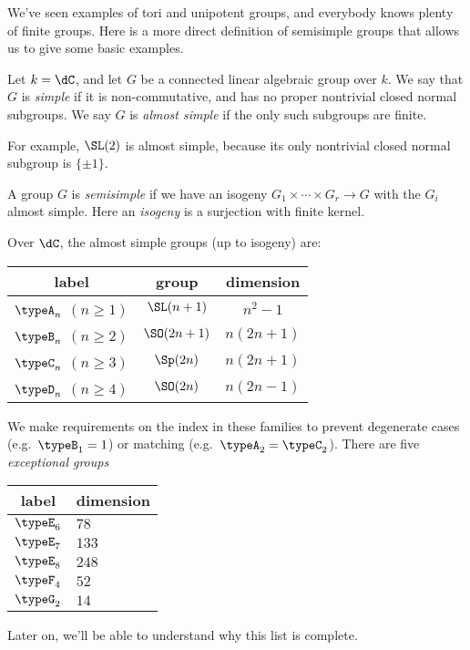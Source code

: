We've seen examples of tori and unipotent groups, and everybody knows plenty of 
finite groups. Here is a more direct definition of semisimple groups that 
allows us to give some basic examples. 

\begin{example}[Semisimple]
Let $k=\dC$, and let $G$ be a connected linear 
algebraic group over $k$. We say that $G$ is \emph{simple} if it is 
non-commutative, and has no proper nontrivial closed normal subgroups. We say 
$G$ is \emph{almost simple} if the only such subgroups are finite. 

For example, $\SL(2)$ is almost simple, because its only nontrivial 
closed normal subgroup is $\{\pm 1\}$. 

A group $G$ is \emph{semisimple} if we have an isogeny 
$G_1\times \cdots \times G_r\to G$ with the $G_i$ almost simple. Here an 
\emph{isogeny} is a surjection with finite kernel. 
\end{example}

Over $\dC$, the almost simple groups (up to isogeny) are: 
\begin{center}
\begin{tabular}{c|c|c}
label & group & dimension \\ \hline
$\typeA_n$ $(n\geqslant 1)$ & $\SL(n+1)$ & $n^2-1$ \\
$\typeB_n$ $(n\geqslant 2)$ & $\SO(2n+1)$ & $n(2n+1)$\\
$\typeC_n$ $(n\geqslant 3)$ & $\Sp(2n)$ & $n(2n+1)$ \\
$\typeD_n$ $(n\geqslant 4)$ & $\SO(2n)$ & $n(2n-1)$
\end{tabular}
\end{center}
We make requirements on the index in these families to prevent degenerate 
cases (e.g.~$\typeB_1=1$) or matching (e.g.~$\typeA_2=\typeC_2$). There are 
five \emph{exceptional groups} 
\begin{center}
\begin{tabular}{c|l}
label & dimension \\ \hline
$\typeE_6$ & $78$ \\
$\typeE_7$ & $133$ \\
$\typeE_8$ & $248$ \\
$\typeF_4$ & $52$ \\
$\typeG_2$ & $14$
\end{tabular}
\end{center}
Later on, we'll be able to understand why this list is complete.
